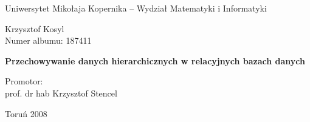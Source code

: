 


\begin{titlepage}
	\begin{center}
		Uniwersytet Mikołaja Kopernika -- Wydział Matematyki i Informatyki
	\end{center}

	\vfill

	\begin{flushleft}
		Krzysztof Kosyl\\
		Numer albumu: 187411
	\end{flushleft}

	\vfill\vfill

	\begin{center}
		\huge{\textbf{Przechowywanie danych hierarchicznych w relacyjnych bazach danych}}
	\end{center}

	\vfill\vfill\vfill\vfill

	\begin{flushright}
		Promotor:\\
		prof. dr hab Krzysztof Stencel
	\end{flushright}

	\vfill
	\begin{center}
		Toruń 2008
	\end{center}
\end{titlepage}
